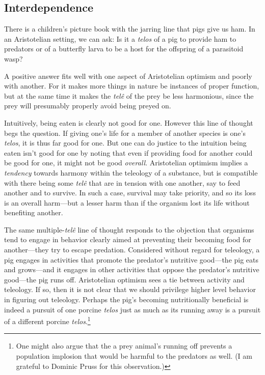 \subsection{Interdependence}
There is a children's picture book with the
jarring line that pigs give us ham. In an Aristotelian setting, we can ask: Is it a \textit{telos} of a pig
to provide ham to predators or of a butterfly larva to be a host for the offspring of a parasitoid wasp? 

A positive answer fits well with one aspect of Aristotelian optimism and poorly with another. For it makes
more things in nature be instances of proper function, but at the same time it makes the \textit{tel\^e} of
the prey be less harmonious, since the prey will presumably properly avoid being preyed on. 

Intuitively,
being eaten is clearly not good for one. However this line of thought begs the question. 
If giving one's life for a member of another species is one's \textit{telos}, it is thus far good for one.
But one can do justice to the intuition being eaten isn't good for one by noting that even if providing
food for another could be good for one, it might not be good \textit{overall}. Aristotelian optimism 
implies a \textit{tendency} towards harmony within the teleology of a substance, but is compatible with
there being some \textit{tel\^e} that are in tension with one another, say to feed another and to survive.
In such a case, survival may take priority, and so its loss is an overall harm---but a lesser harm than if
the organism lost its life without benefiting another. 

The same multiple-\textit{tel\^e} line of thought responds to the objection that organisms tend 
to engage in behavior clearly aimed at preventing their becoming
food for another---they try to escape predation. Considered without regard for teleology, a pig engages
in activities that promote the predator's nutritive good---the pig eats and grows---and it engages
in other activities that oppose the predator's nutritive good---the pig runs off. Aristotelian optimism
sees a tie between activity and teleology. If so, then it is not clear that we should privilege higher
level behavior in figuring out teleology. Perhaps the pig's becoming nutritionally beneficial is indeed
a pursuit of one porcine \textit{telos} just as much as its running away is a pursuit of a different
porcine \textit{telos}.\footnote{One might also argue that the a prey animal's running off prevents a population
implosion that would be harmful to the predators as well. (I am grateful to Dominic Pruss for this 
observation.)}

